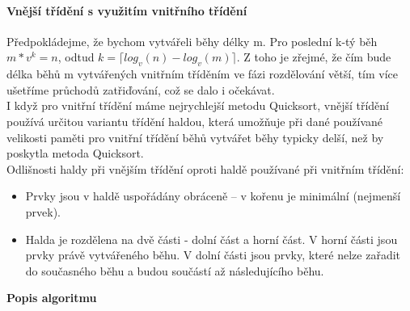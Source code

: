 \documentclass[10pt,a4paper]{article}
\begin{document}
\paragraph{Vnější třídění s využitím vnitřního třídění} Předpokládejme, že bychom vytvářeli běhy délky m. Pro poslední k-tý běh $m \ast v^k = n$, odtud $k = \lceil log_v(n)-log_v(m) \rceil$. Z toho je zřejmé, že čím bude délka běhů m vytvářených vnitřním tříděním ve fázi rozdělování větší, tím více ušetříme průchodů zatřiďování, což se dalo i očekávat. \\
I když pro vnitřní třídění máme nejrychlejší metodu Quicksort, vnější třídění používá určitou variantu třídění haldou, která umožňuje při dané používané velikosti paměti pro vnitřní třídění běhů vytvářet běhy typicky delší, než by poskytla metoda Quicksort. \\
Odlišnosti haldy při vnějším třídění oproti haldě používané při vnitřním třídění:
\begin{itemize}
	\item Prvky jsou v haldě uspořádány obráceně – v kořenu je minimální (nejmenší prvek).
	\item Halda je rozdělena na dvě části - dolní část a horní část. V horní části jsou prvky právě vytvářeného běhu. V dolní části jsou prvky, které nelze zařadit do současného běhu a budou součástí až následujícího běhu.
\end{itemize}
\textbf{Popis algoritmu}
\end{document}
